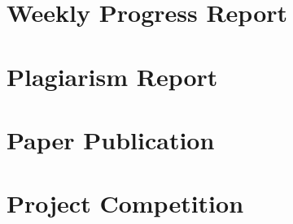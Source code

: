 \appendix
\appendixpage
\addappheadtotoc
\chapter{Weekly Progress Report}

\chapter{Plagiarism Report }

\chapter{Paper Publication}

\chapter{Project Competition}